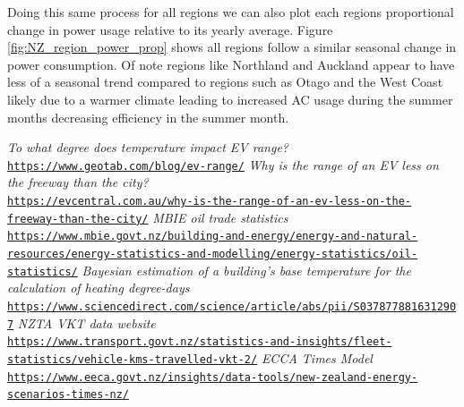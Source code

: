 \documentclass[
]{article}
\begin{document}
Doing this same process for all regions we can also plot each regions
proportional change in power usage relative to its yearly average.
Figure \ref{fig:NZ_region_power_prop} shows all regions follow a similar
seasonal change in power consumption. Of note regions like Northland and
Auckland appear to have less of a seasonal trend compared to regions
such as Otago and the West Coast likely due to a warmer climate leading
to increased AC usage during the summer months decreasing efficiency in
the summer month.

\begin{thebibliography}{9}
\textit{To what degree does temperature impact EV range?}
\\\texttt{\url{https://www.geotab.com/blog/ev-range/}}
\textit{Why is the range of an EV less on the freeway than the city?}
\\\texttt{\url{https://evcentral.com.au/why-is-the-range-of-an-ev-less-on-the-freeway-than-the-city/}}
\textit{MBIE oil trade statistics}
\\\texttt{\url{https://www.mbie.govt.nz/building-and-energy/energy-and-natural-resources/energy-statistics-and-modelling/energy-statistics/oil-statistics/}}
\textit{Bayesian estimation of a building's base temperature for the calculation of heating degree-days}
\\\texttt{\url{https://www.sciencedirect.com/science/article/abs/pii/S0378778816312907}}
\textit{NZTA VKT data website}
\\\texttt{\url{https://www.transport.govt.nz/statistics-and-insights/fleet-statistics/vehicle-kms-travelled-vkt-2/}}
\textit{ECCA Times Model}
\\\texttt{\url{https://www.eeca.govt.nz/insights/data-tools/new-zealand-energy-scenarios-times-nz/}}
\end{thebibliography}
\end{document}
